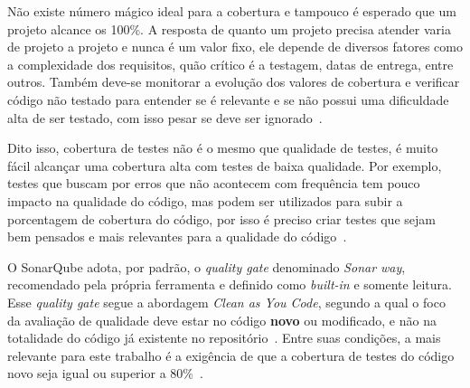
Não existe número mágico ideal para a cobertura e tampouco é esperado que um projeto alcance os 100\%.
A resposta de quanto um projeto precisa atender varia de projeto a projeto e nunca é um valor fixo,
ele depende de diversos fatores como a complexidade dos requisitos, quão crítico é a testagem, datas de entrega, entre outros.
Também deve-se monitorar a evolução dos valores de cobertura e verificar código não testado para entender se é relevante
e se não possui uma dificuldade alta de ser testado, com isso pesar se deve ser ignorado~\cite{valente2020engenharia}.


Dito isso, cobertura de testes não é o mesmo que qualidade de testes, é muito fácil alcançar uma cobertura alta com testes de baixa qualidade.
Por exemplo, testes que buscam por erros que não acontecem com frequência tem pouco impacto na qualidade do código, mas podem ser utilizados para subir a porcentagem de cobertura do código,
por isso é preciso criar testes que sejam bem pensados e mais relevantes para a qualidade do código~\cite{fowler2012test}.

O SonarQube adota, por padrão, o \textit{quality gate} denominado \textit{Sonar way}, recomendado pela própria ferramenta e definido como \textit{built-in} e somente leitura.
Esse \textit{quality gate} segue a abordagem \textit{Clean as You Code}, segundo a qual o foco da avaliação de qualidade deve estar no código \textbf{novo} ou modificado, e não na totalidade do código já existente no repositório~\cite{sonarqube_qualitygates}.
Entre suas condições, a mais relevante para este trabalho é a exigência de que a cobertura de testes do código novo seja igual ou superior a 80\%~\cite{sonarqube_qualitygates}.

